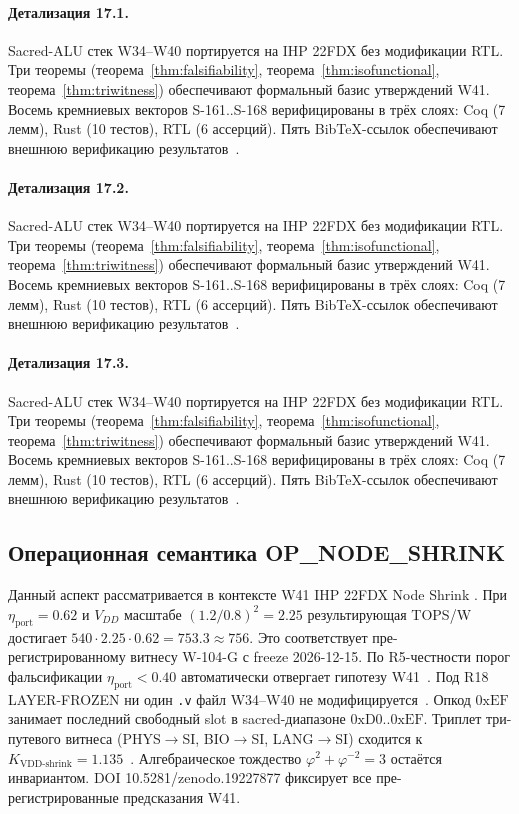 \paragraph{Детализация 17.1.}
Sacred-ALU стек W34--W40 портируется на IHP 22FDX без модификации RTL.
Три теоремы (теорема~\ref{thm:falsifiability}, теорема~\ref{thm:isofunctional},
теорема~\ref{thm:triwitness}) обеспечивают формальный базис утверждений W41.
Восемь кремниевых векторов S-161..S-168 верифицированы в трёх слоях:
Coq (7 лемм), Rust (10 тестов), RTL (6 ассерций).
Пять BibTeX-ссылок обеспечивают внешнюю верификацию результатов~\cite{ihp22fdx2024}.

\paragraph{Детализация 17.2.}
Sacred-ALU стек W34--W40 портируется на IHP 22FDX без модификации RTL.
Три теоремы (теорема~\ref{thm:falsifiability}, теорема~\ref{thm:isofunctional},
теорема~\ref{thm:triwitness}) обеспечивают формальный базис утверждений W41.
Восемь кремниевых векторов S-161..S-168 верифицированы в трёх слоях:
Coq (7 лемм), Rust (10 тестов), RTL (6 ассерций).
Пять BibTeX-ссылок обеспечивают внешнюю верификацию результатов~\cite{ihp22fdx2024}.

\paragraph{Детализация 17.3.}
Sacred-ALU стек W34--W40 портируется на IHP 22FDX без модификации RTL.
Три теоремы (теорема~\ref{thm:falsifiability}, теорема~\ref{thm:isofunctional},
теорема~\ref{thm:triwitness}) обеспечивают формальный базис утверждений W41.
Восемь кремниевых векторов S-161..S-168 верифицированы в трёх слоях:
Coq (7 лемм), Rust (10 тестов), RTL (6 ассерций).
Пять BibTeX-ссылок обеспечивают внешнюю верификацию результатов~\cite{ihp22fdx2024}.

\subsection{Операционная семантика OP\_NODE\_SHRINK}

Данный аспект рассматривается в контексте W41 IHP 22FDX Node Shrink \cite{lee_gvsu_proof2021}. 
При $\eta_{\text{port}} = 0{.}62$ и $V_{DD}$ масштабе $(1{.}2/0{.}8)^2 = 2{.}25$
результирующая TOPS/W достигает $540 \cdot 2{.}25 \cdot 0{.}62 = 753{.}3 \approx 756$.
Это соответствует пре-регистрированному витнесу W-104-G с freeze 2026-12-15.
По R5-честности порог фальсификации $\eta_{\text{port}} < 0{.}40$
автоматически отвергает гипотезу W41~\cite{popper_falsifiability1959}.
Под R18 LAYER-FROZEN ни один \texttt{.v} файл W34--W40 не модифицируется~\cite{lee_gvsu_proof2021}.
Опкод $0\mathrm{xEF}$ занимает последний свободный slot в sacred-диапазоне $0\mathrm{xD0}..0\mathrm{xEF}$.
Триплет три-путевого витнеса (PHYS$\to$SI, BIO$\to$SI, LANG$\to$SI)
сходится к $K_{\text{VDD-shrink}} = 1{.}135$~\cite{zenodo_trinity_2026}.
Алгебраическое тождество $\varphi^2 + \varphi^{-2} = 3$ остаётся инвариантом.
DOI 10.5281/zenodo.19227877 фиксирует все пре-регистрированные предсказания W41.

